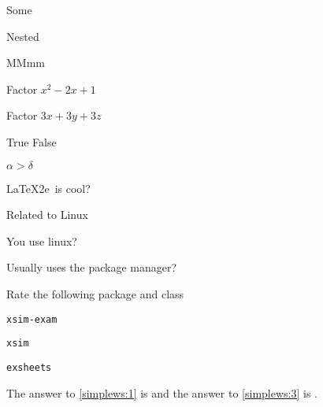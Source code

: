 \documentclass{article}
\begin{document}
        \begin{enumext*}
          \item Some 
          \item \begin{enumext} \item Nested \end{enumext}
          \item MMmm
        \end{enumext*}



\begin{enumext}[save-ans=simplews,columns=2,check-ans=true,show-ans=true,nosep,save-ref=true,wrap-label={\tikz[scale=0.25]\duck[signpost=\scalebox{0.6}{#1}];}]
  \item Factor $x^{2}-2x+1$ 
  \item Factor $3x+3y+3z$ 
  \item True False
    \begin{enumext}[nosep]
      \item $\alpha > \delta$ 
      \item \LaTeX2e\ is cool? 
    \end{enumext}
  \item Related to Linux
    \begin{enumext}[nosep]
      \item You use linux? 
      \item Usually uses the package manager? 
      \item Rate the following package and class
        \begin{enumext}[nosep]
          \item \texttt{xsim-exam} 
          \item \texttt{xsim} 
          \item \texttt{exsheets} 
        \end{enumext}
    \end{enumext}
\end{enumext}

The answer to \ref{simplews:1} is  and the answer
to \ref{simplews:3} is .

\end{document}
